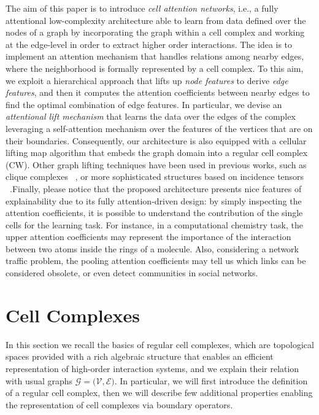 \documentclass{article}
\begin{document}
The aim of this paper is to introduce \textit{cell attention networks}, i.e., a fully  attentional low-complexity architecture able to learn from data defined over the nodes of a graph by incorporating the graph within a cell complex and working at the edge-level in order to extract higher order interactions. The idea is to implement an attention mechanism that handles relations among nearby edges, where the neighborhood is formally represented by a cell complex. To this aim, we exploit a hierarchical approach that lifts up {\it node features} to derive {\it edge features}, and then it computes the attention coefficients between nearby edges to find the optimal combination of edge features. In particular, we devise an \emph{attentional lift mechanism} that learns the data over the edges of the complex leveraging a self-attention mechanism over the features of the vertices that are on their boundaries. Consequently, our architecture is also equipped with a cellular lifting map algorithm that embeds the graph domain into a regular cell complex (CW).   Other graph lifting techniques have been used in previous works, such as  clique complexes ~\cite{Ferri2018,Milo2002}, or more sophisticated structures based on incidence tensors ~\cite{albooyeh-etal-2020-sample}.Finally, please notice that the proposed  architecture presents nice features of explainability due to its fully attention-driven design: by simply inspecting the attention coefficients, it is possible to understand the contribution of the single cells for the learning task. For instance, in a computational chemistry task, the upper attention coefficients may represent the importance of the interaction between two atoms inside the rings of a molecule. Also, considering a network traffic problem, the pooling attention coefficients may tell us which links can be considered obsolete, or even detect communities in social networks. 



\section{Cell Complexes}


In this section we recall the basics of regular cell complexes,  which are topological spaces provided with a rich algebraic structure that enables an efficient representation of high-order interaction systems, and we explain their relation with usual graphs $\mathcal{G}=(\mathcal{V},\mathcal{E)}$. In particular, we will first introduce the  definition of a regular cell complex, then we will describe few additional properties enabling the representation of cell complexes via boundary operators.
\end{document}
